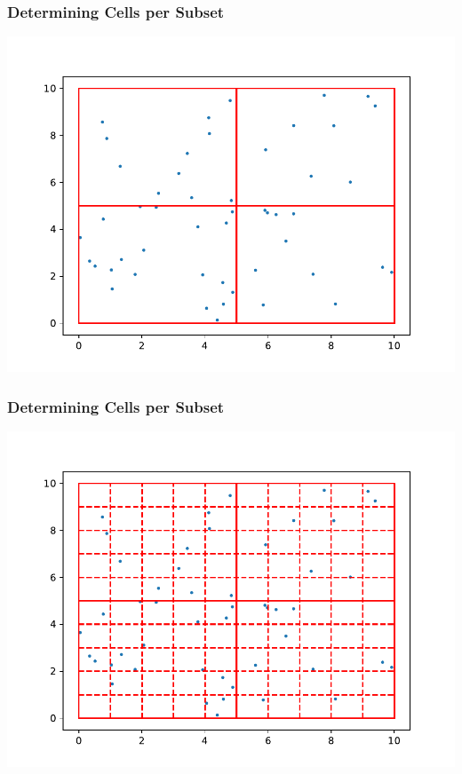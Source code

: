 \documentclass[xcolor={usenames,dvipsnames,svgnames,table}]{beamer}
\begin{document}
\begin{frame}[t]\frametitle{Determining Cells per Subset}
	\centering
	\includegraphics[scale=0.65]{figures/mesh_subsets.pdf}
\end{frame}

\begin{frame}[t]\frametitle{Determining Cells per Subset}
	\centering
	\includegraphics[scale=0.65]{figures/full_mesh_density.pdf}
\end{frame}
\end{document}
